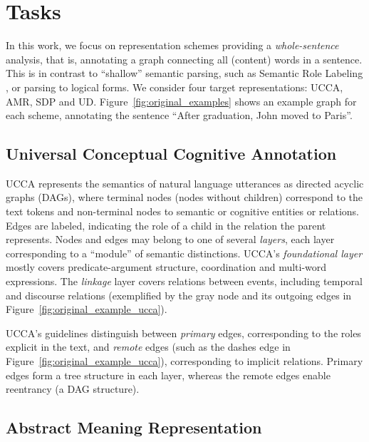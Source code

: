 \documentclass[11pt,a4paper]{article}
\begin{document}
\section{Tasks}\label{sec:tasks}

In this work, we focus on representation schemes providing a \textit{whole-sentence} analysis,
that is, annotating a graph connecting all (content) words in a sentence.
This is in contrast to ``shallow'' semantic parsing,
such as Semantic Role Labeling
\cite[SRL;][]{Palmer:05,gildea2002automatic,swayamdipta2017frame,ringgaard2017sling},
or parsing to logical forms.
We consider four target representations: UCCA, AMR, SDP and UD.
Figure~\ref{fig:original_examples} shows an example graph for each scheme,
annotating the sentence ``After graduation, John moved to Paris''.

\subsection{Universal Conceptual Cognitive Annotation}\label{sec:ucca}

UCCA \cite{abend2013universal} represents the semantics of natural language utterances
as directed acyclic graphs (DAGs), where terminal nodes (nodes without children)
correspond to the text tokens and
non-terminal nodes to semantic or cognitive entities or relations.
Edges are labeled, indicating the role of a child in the relation the parent represents.
Nodes and edges may belong to one of several \textit{layers}, each layer corresponding
to a ``module'' of semantic distinctions.
UCCA's \textit{foundational layer} mostly covers predicate-argument
structure, coordination and multi-word expressions.
The \textit{linkage} layer covers relations between events, including temporal and discourse relations
(exemplified by the gray node and its outgoing edges in Figure~\ref{fig:original_example_ucca}).

UCCA's guidelines distinguish between \textit{primary} edges, corresponding to the roles explicit
in the text, and \textit{remote} edges (such as the dashes edge in
Figure~\ref{fig:original_example_ucca}), corresponding to implicit relations.
Primary edges form a tree structure in each layer,
whereas the remote edges enable reentrancy (a DAG structure).


\subsection{Abstract Meaning Representation}\label{sec:amr}
\end{document}
